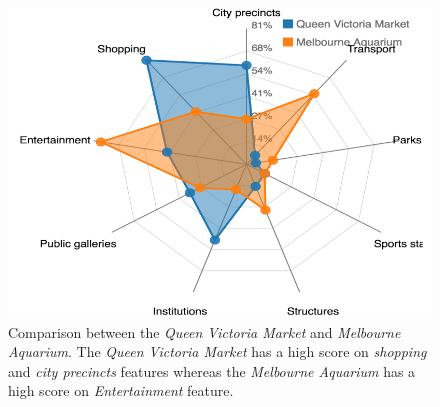 \begin{figure}[t!]
\includegraphics[width=0.8\linewidth]{figure/sample_radar.png}
    \caption{Comparison between the \textit{Queen Victoria Market} and \textit{Melbourne Aquarium}. The \textit{Queen Victoria Market} has a high score on \textit{shopping} and \textit{city precincts} features whereas the \textit{Melbourne Aquarium} has a high score on \textit{Entertainment} feature.}
\label{fig:radar}
\end{figure}

